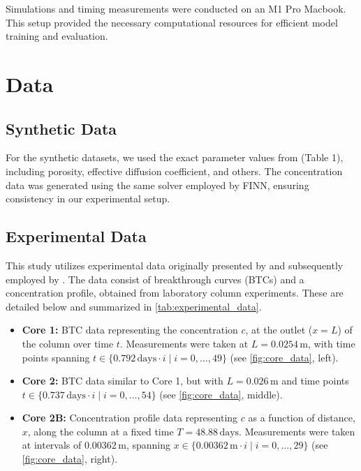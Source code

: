 Simulations and timing measurements were conducted on an M1 Pro Macbook. This setup provided the necessary computational resources for efficient model training and evaluation.


\section{Data}
\subsection{Synthetic Data}
\label{sec:synthetic_data}
For the synthetic datasets, we used the exact parameter values from \citet{finn} (Table 1), including porosity, effective diffusion coefficient, and others. The concentration data was generated using the same solver employed by FINN, ensuring consistency in our experimental setup.


\subsection{Experimental Data}
\label{sec:experimental_data}

This study utilizes experimental data originally presented by \citet{nowak2016entropy} and subsequently employed by \citet{finn}. The data consist of breakthrough curves (BTCs) and a concentration profile, obtained from laboratory column experiments. These are detailed below and summarized in \cref{tab:experimental_data}.

\begin{itemize}
    \item \textbf{Core 1:} BTC data representing the concentration $c$, at the outlet ($x = L$) of the column over time $t$. Measurements were taken at $L = 0.0254\,\text{m}$, with time points spanning $t \in \{0.792\,\text{days} \cdot i \mid i = 0, \dots, 49\}$ (see \cref{fig:core_data}, left).
    \item \textbf{Core 2:} BTC data similar to Core 1, but with $L = 0.026\,\text{m}$ and time points $t \in \{0.737\,\text{days} \cdot i \mid i = 0, \dots, 54\}$ (see \cref{fig:core_data}, middle).
    \item \textbf{Core 2B:} Concentration profile data representing $c$ as a function of distance, $x$, along the column at a fixed time $T = 48.88\,\text{days}$. Measurements were taken at intervals of $0.00362\,\text{m}$, spanning $x \in \{0.00362\,\text{m} \cdot i \mid i = 0, \dots, 29\}$ (see \cref{fig:core_data}, right).
\end{itemize}

